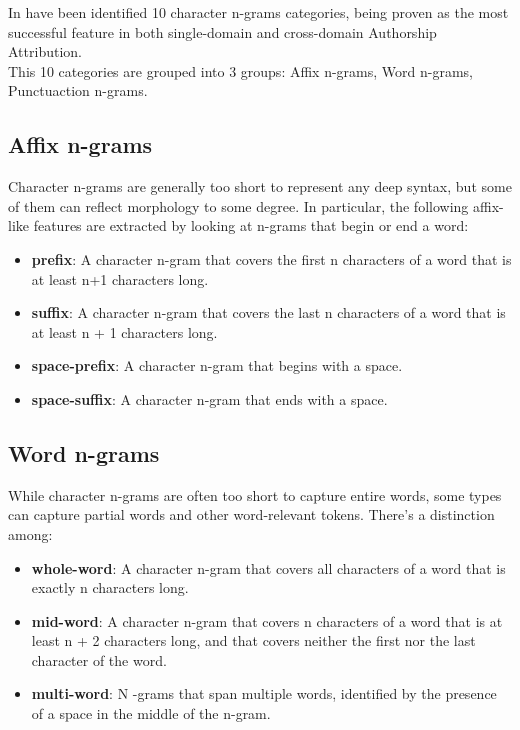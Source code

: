 In \cite{sapkota2015not} have been identified 10 character n-grams categories, being proven as the most successful feature in both single-domain and cross-domain Authorship Attribution.\\
This 10 categories are grouped into 3 groups: Affix n-grams, Word n-grams, Punctuaction n-grams.

\subsection{Affix n-grams}
Character n-grams are generally too short to represent any deep syntax, but some of them can reflect morphology to some degree. In particular, the following affix-like features are extracted by looking at n-grams that begin or end a word:

\begin{itemize}
	\item \textbf{prefix}: A character n-gram that covers the first n characters of a word that is at least n+1 characters long.
	\item \textbf{suffix}: A character n-gram that covers the last n characters of a word that is at least n + 1 characters long.
	\item \textbf{space-prefix}: A character n-gram that begins with a space.
	\item \textbf{space-suffix}: A character n-gram that ends with a space.
\end{itemize}

\subsection{Word n-grams}
While character n-grams are often too short to capture entire words, some types can capture partial
words and other word-relevant tokens. There's a distinction among:

\begin{itemize}
	\item \textbf{whole-word}: A character n-gram that covers all characters of a word that is exactly n characters long.
	\item \textbf{mid-word}: A character n-gram that covers n characters of a word that is at least n + 2 characters long, and that covers neither the first nor the last character of the word.
	\item \textbf{multi-word}: N -grams that span multiple words, identified by the presence of a space in the middle of the n-gram.
\end{itemize}

